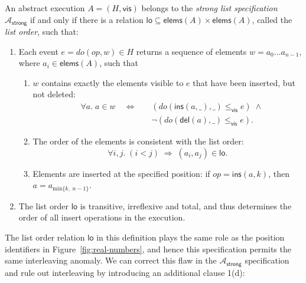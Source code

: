 \documentclass[sigconf]{acmart}
\begin{document}
\begin{displayquote}
  An abstract execution $A = (H, \textsf{vis})$ belongs to the \emph{strong list specification} $\mathcal{A}_\textsf{strong}$ if and only if there is a relation $\textsf{lo} \subseteq \textsf{elems}(A) \times \textsf{elems}(A)$, called the \emph{list order}, such that:
  \begin{enumerate}
    \item Each event $e = \mathit{do}(\mathit{op}, w) \in H$ returns a sequence of elements $w=a_0 \dots a_{n-1}$, where $a_i \in \textsf{elems}(A)$, such that
    \begin{enumerate}
      \item $w$ contains exactly the elements visible to $e$ that have been inserted, but not deleted:
	    \begin{align*}
          \quad\forall a.\; a \in w \quad\Longleftrightarrow\quad &
		  (\mathit{do}(\textsf{ins}(a, \_), \_) \le_\textsf{vis} e) \;\wedge\\ &
		  \neg(\mathit{do}(\textsf{del}(a), \_) \le_\textsf{vis} e).
		\end{align*}
      \item The order of the elements is consistent with the list order:
        \[ \forall i, j.\; (i < j) \;\Longrightarrow\; (a_i, a_j) \in \textsf{lo}. \]
      \item Elements are inserted at the specified position:
        if $\mathit{op} = \textsf{ins}(a, k)$, then $a = a_{\mathrm{min} \{k,\; n-1\}}$.
    \end{enumerate}
    \item The list order $\textsf{lo}$ is transitive, irreflexive and total, and thus determines the order of all insert operations in the execution.
  \end{enumerate}
\end{displayquote}
The list order relation $\textsf{lo}$ in this definition plays the same role as the position identifiers in Figure~\ref{fig:real-numbers}, and hence this specification permits the same interleaving anomaly.
We can correct this flaw in the $\mathcal{A}_\textsf{strong}$ specification and rule out interleaving by introducing an additional clause 1(d):
\end{document}
